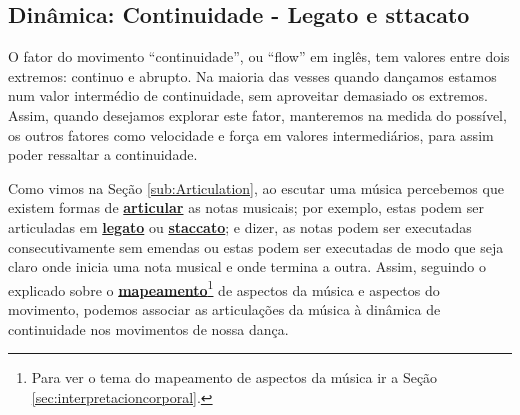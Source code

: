 \subsection{Dinâmica: Continuidade - Legato e sttacato }


O fator do movimento ``continuidade'', 
ou ``flow'' em inglês, tem valores entre dois extremos: continuo e  abrupto.
Na maioria das vesses quando dançamos estamos num valor intermédio de continuidade,
sem aproveitar demasiado os extremos.
Assim, quando desejamos explorar este fator, manteremos na medida do possível,
os outros fatores como velocidade e força em valores intermediários,
para assim poder ressaltar a continuidade.

Como vimos na Seção \ref{sub:Articulation}, 
ao escutar uma música percebemos que existem formas de \hyperref[sub:Articulation]{\textbf{articular}} as notas musicais;
por exemplo, estas podem ser articuladas em 
\hyperref[subsec:Legato]{\textbf{legato}} ou \hyperref[subsec:Staccato]{\textbf{staccato}};
e dizer, as notas podem ser executadas consecutivamente sem emendas ou 
estas podem ser executadas de modo que seja claro onde inicia uma nota musical e onde termina a outra.
Assim, 
seguindo o explicado sobre o \hyperref[sec:interpretacioncorporal]{\textbf{mapeamento}}\footnote{Para
ver o tema do mapeamento de aspectos da música ir a Seção \ref{sec:interpretacioncorporal}.} 
de aspectos da música e aspectos do movimento,
podemos associar as articulações da música à dinâmica de continuidade nos movimentos de nossa dança.\\


